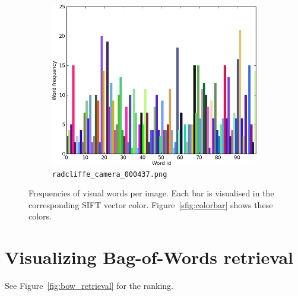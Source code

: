 \documentclass[a4paper,10pt,twoside]{article}
\begin{document}
\begin{figure}
  \begin{subfigure}{0.49\textwidth}
    \centering
    \includegraphics[width=\textwidth,height=.3\textheight,keepaspectratio]{histogram5}
    \caption{\texttt{radcliffe\_camera\_000437.png}}
  \end{subfigure}
  \caption{Frequencies of visual words per image.  Each bar is visualised in the corresponding SIFT vector color.  Figure~\ref{sfig:colorbar} shows these colors.}
  \label{fig:histograms}
\end{figure}

\section{Visualizing Bag-of-Words retrieval}
See Figure~\ref{fig:bow_retrieval} for the ranking.
\end{document}

